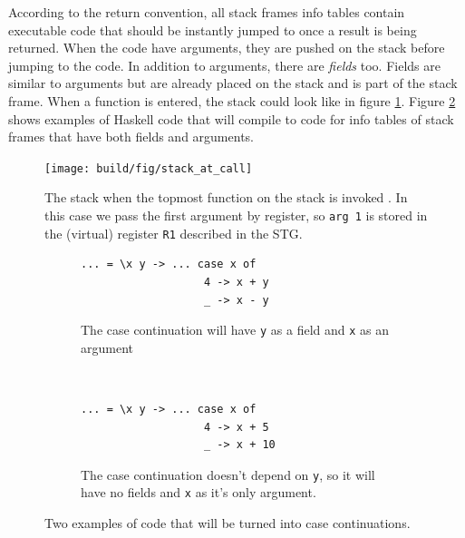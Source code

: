 According to the return convention,
all stack frames info tables contain executable code that should be
instantly jumped to once a result is being returned. \cite{commentary_return_convention} When the code
have arguments, they are pushed on the stack before jumping to the code.
In addition to arguments, there are \emph{fields} too.
Fields are similar to arguments but are already placed on the stack
and is part of the stack frame. When a function is entered,
the stack could look like in figure \ref{fig:stack_at_call}. Figure \ref{fig:field_and_arguments} shows examples
of Haskell code that will compile to code for info tables
of stack frames that have both fields and arguments.

\begin{figure}
\begin{mdframed}
  \texttt{[image: build/fig/stack\_at\_call]}
  \caption{The stack when the topmost function on the stack is invoked \cite{github_stack_at_call}.
In this case we pass the first argument by register, so \texttt{arg 1}
is stored in the (virtual) register \texttt{R1} described in the STG.}
  \label{fig:stack_at_call}
\end{mdframed}
\end{figure}

\begin{figure}
\begin{mdframed}
        \begin{subfigure}[t]{0.5\textwidth}
          \begin{verbatim}
... = \x y -> ... case x of
                   4 -> x + y
                   _ -> x - y
          \end{verbatim}
          \caption{The case continuation will have \texttt{y} as a field
and \texttt{x} as an argument}
        \end{subfigure}
    ~ %
        \begin{subfigure}[t]{0.5\textwidth}
          \begin{verbatim}
... = \x y -> ... case x of
                   4 -> x + 5
                   _ -> x + 10
          \end{verbatim}
          \caption{The case continuation doesn't depend on \texttt{y},
so it will have no fields and \texttt{x} as it's only argument.}
        \end{subfigure}
  \caption{Two examples of code that will be turned into case
continuations.}
  \label{fig:field_and_arguments}
\end{mdframed}
\end{figure}

